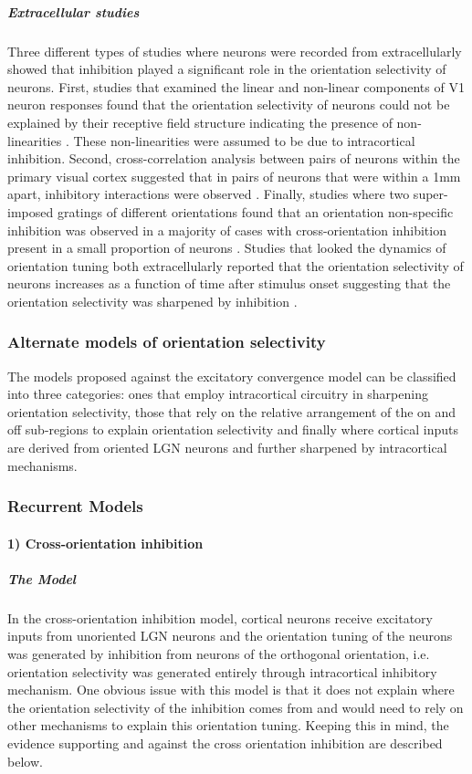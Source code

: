 \subparagraph{Extracellular studies}

Three different types of studies where neurons were recorded from extracellularly showed that inhibition played a significant role in the orientation selectivity of neurons. First, studies that examined the linear and non-linear components of V1 neuron responses found that the orientation selectivity of neurons could not be explained by their receptive field structure indicating the presence of non-linearities \cite{Watkins1974, Gardner1999}. These non-linearities were assumed to be due to intracortical inhibition. Second, cross-correlation analysis between pairs of neurons within the primary visual cortex suggested that in pairs of neurons that were within a 1mm apart, inhibitory interactions were observed \cite{Hata1988}. Finally, studies where two super-imposed gratings of different orientations found that an orientation non-specific inhibition was observed in a majority of cases with cross-orientation inhibition present in a small proportion of neurons \cite{Bonds1989}. Studies that looked the dynamics of orientation tuning both extracellularly reported that the orientation selectivity of neurons increases as a function of time after stimulus onset suggesting that the orientation selectivity was sharpened by inhibition \cite{Shapley2003}.

\subsubsection{Alternate models of orientation selectivity}

The models proposed against the excitatory convergence model can be classified into three categories: ones that employ intracortical circuitry in sharpening orientation selectivity, those that rely on the relative arrangement of the on and off sub-regions to explain orientation selectivity and finally where cortical inputs are derived from oriented LGN neurons and further sharpened by intracortical mechanisms.

\subsubsection{Recurrent Models}

\paragraph{1) Cross-orientation inhibition}

\subparagraph{The Model} In the cross-orientation inhibition model, cortical neurons receive excitatory inputs from unoriented LGN neurons and the orientation tuning of the neurons was generated by inhibition from neurons of the orthogonal orientation, i.e. orientation selectivity was generated entirely through intracortical inhibitory mechanism. One obvious issue with this model is that it does not explain where the orientation selectivity of the inhibition comes from and would need to rely on other mechanisms to explain this orientation tuning. Keeping this in mind, the evidence supporting and against the cross orientation inhibition are described below. 


